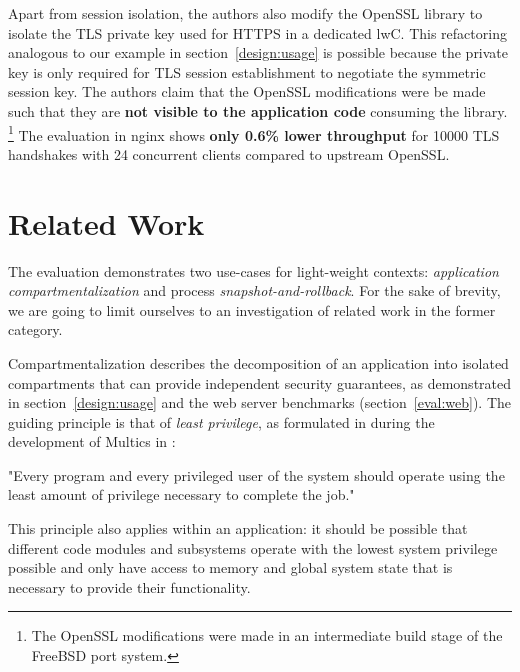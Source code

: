\documentclass[10pt,twocolumn,a4paper]{article}
\begin{document}
Apart from session isolation, the authors also modify the OpenSSL library to isolate the TLS private key used for HTTPS in a dedicated lwC.
This refactoring analogous to our example in section~\ref{design:usage} is possible because the private key is only required for TLS session establishment to negotiate the symmetric session key.
The authors claim that the OpenSSL modifications were be made such that they are \textbf{not visible to the application code} consuming the library.
\footnote{The OpenSSL modifications were made in an intermediate build stage of the FreeBSD port system.}
The evaluation in nginx shows \textbf{only 0.6\% lower throughput} for 10000 TLS handshakes with 24 concurrent clients compared to upstream OpenSSL.
\cite{lwcpaper}

\section{Related Work}\label{rel}
The evaluation demonstrates two use-cases for light-weight contexts: \textit{application compartmentalization} and process \textit{snapshot-and-rollback}.
For the sake of brevity, we are going to limit ourselves to an investigation of related work in the former category.

Compartmentalization describes the decomposition of an application into isolated compartments that can provide independent security guarantees, as demonstrated in section~\ref{design:usage} and the web server benchmarks (section~\ref{eval:web}).
The guiding principle is that of \textit{least privilege}, as formulated in during the development of Multics in \citeyear{principleofleastprivilege}:%
\begin{displayquote}
"Every program and every privileged user of the system should operate using the least amount of privilege necessary to complete the job."
\cite{principleofleastprivilege}
\end{displayquote}
This principle also applies within an application: it should be possible that different code modules and subsystems operate with the lowest system privilege possible and only have access to memory and global system state that is necessary to provide their functionality.
\end{document}
